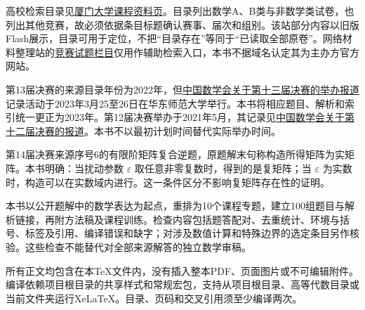 \documentclass[UTF8,12pt,a4paper,fontset=fandol]{ctexart}
\begin{document}
高校检索目录见\href{https://gdjpkc.xmu.edu.cn/DocumentList.aspx?cID=22&dID=383}{厦门大学课程资料页}。目录列出数学A、B类与非数学类试卷，也列出其他竞赛，故必须依据条目标题确认赛事、届次和组别。该站部分内容以旧版Flash展示，目录可用于定位，不把“目录存在”等同于“已读取全部原卷”。网络材料整理站的\href{https://www.cmathc.org.cn/shiti/}{竞赛试题栏目}仅用作辅助检索入口，本书不据域名认定其为主办方官方网站。

第13届决赛的来源目录年份为2022年，但\href{https://www.cms.org.cn/Home/news/news_details/id/1048.html}{中国数学会关于第十三届决赛的举办报道}记录活动于2023年3月25至26日在华东师范大学举行。本书将相应题目、解析和索引统一更正为2023年。第12届决赛举办于2021年5月，其记录见\href{https://www.cms.org.cn/Home/comp/comp_details/id/193.html}{中国数学会关于第十二届决赛的报道}。本书不以最初计划时间替代实际举办时间。

第14届决赛来源序号6的有限阶矩阵复合逆题，原题解末句称构造所得矩阵为实矩阵。本书明确：当扰动参数 $\varepsilon$ 取任意非零复数时，得到的是复矩阵；当 $\varepsilon$ 为实数时，构造可以在实数域内进行。这一条件区分不影响复矩阵存在性的证明。

本书以公开题解中的数学表达为起点，重排为10个课程专题，建立100组题目与解析链接，再附方法稿及课程训练。检查内容包括题答配对、去重统计、环境与括号、标签及引用、编译错误和缺字；对涉及数值计算和特殊边界的选定条目另作核验。这些检查不能替代对全部来源解答的独立数学审稿。

所有正文均包含在本TeX文件内，没有插入整本PDF、页面图片或不可编辑附件。编译依赖项目根目录的共享样式和常规宏包，支持从项目根目录、高等代数目录或当前文件夹运行XeLaTeX。目录、页码和交叉引用须至少编译两次。
\end{document}
